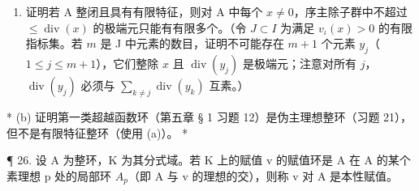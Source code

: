 \begin{enumerate}
\def\labelenumi{(\alph{enumi})}
\tightlist
\item
  证明若 A 整闭且具有有限特征，则对 A 中每个 \(x \neq 0\)，序主除子群中不超过 \(\leqslant \operatorname{div}(x)\) 的极端元只能有有限多个。（令 \(J \subset I\) 为满足 \(v_{\iota}(x) > 0\) 的有限指标集。若 \(m\) 是 J 中元素的数目，证明不可能存在 \(m + 1\) 个元素 \(y_{j}\)（ \(1 \leqslant j \leqslant m + 1\)），它们整除 \(x\) 且 \(\operatorname{div}(y_{j})\) 是极端元；注意对所有 \(j\)，\(\operatorname{div}(y_{j})\) 必须与 \(\sum_{k \neq j} \operatorname{div}(y_{k})\) 互素。）
\end{enumerate}

* (b) 证明第一类超越函数环（第五章 § 1 习题 12）是伪主理想整环（习题 21），但不是有限特征整环（使用 (a)）。 *

¶ 26. 设 A 为整环，K 为其分式域。若 K 上的赋值 v 的赋值环是 A 在 A 的某个素理想 p 处的局部环 \(A_{p}\)（即 A 与 v 的理想的交），则称 v 对 A 是本性赋值。

